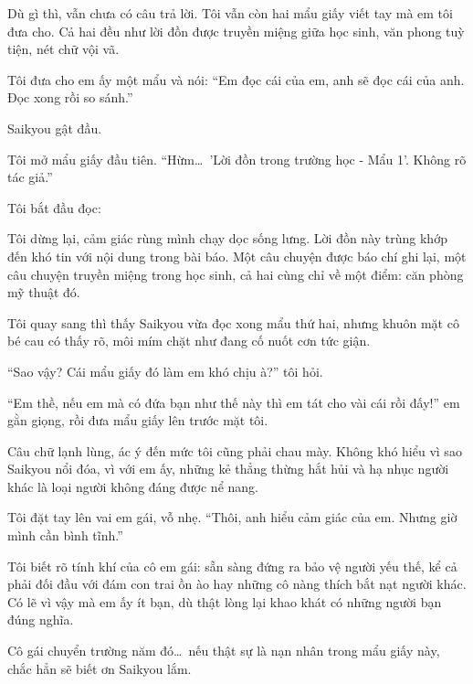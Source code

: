 \documentclass[../main.tex]{subfiles}
\begin{document}
Dù gì thì, vẫn chưa có câu trả lời. Tôi vẫn còn hai mẩu giấy viết tay mà em tôi đưa cho. Cả hai đều như lời đồn được truyền miệng giữa học sinh, văn phong tuỳ tiện, nét chữ vội vã.

Tôi đưa cho em ấy một mẩu và nói: ``Em đọc cái của em, anh sẽ đọc cái của anh. Đọc xong rồi so sánh.''

Saikyou gật đầu.

Tôi mở mẩu giấy đầu tiên.
``Hừm\dots\ {\vnmsans 'Lời đồn trong trường học - Mẩu 1'}. Không rõ tác giả.''

Tôi bắt đầu đọc:


Tôi dừng lại, cảm giác rùng mình chạy dọc sống lưng. Lời đồn này trùng khớp đến khó tin với nội dung trong bài báo. Một câu chuyện được báo chí ghi lại, một câu chuyện truyền miệng trong học sinh, cả hai cùng chỉ về một điểm: căn phòng mỹ thuật đó.

Tôi quay sang thì thấy Saikyou vừa đọc xong mẩu thứ hai, nhưng khuôn mặt cô bé cau có thấy rõ, môi mím chặt như đang cố nuốt cơn tức giận.

``Sao vậy? Cái mẩu giấy đó làm em khó chịu à?'' tôi hỏi.

``Em thề, nếu em mà có đứa bạn như thế này thì em tát cho vài cái rồi đấy!'' em gằn giọng, rồi đưa mẩu giấy lên trước mặt tôi.


Câu chữ lạnh lùng, ác ý đến mức tôi cũng phải chau mày. Không khó hiểu vì sao Saikyou nổi đóa, vì với em ấy, những kẻ thẳng thừng hắt hủi và hạ nhục người khác là loại người không đáng được nể nang.

Tôi đặt tay lên vai em gái, vỗ nhẹ. ``Thôi, anh hiểu cảm giác của em. Nhưng giờ mình cần bình tĩnh.''

Tôi biết rõ tính khí của cô em gái: sẵn sàng đứng ra bảo vệ người yếu thế, kể cả phải đối đầu với đám con trai ồn ào hay những cô nàng thích bắt nạt người khác. Có lẽ vì vậy mà em ấy ít bạn, dù thật lòng lại khao khát có những người bạn đúng nghĩa.

Cô gái chuyển trường năm đó\dots\ nếu thật sự là nạn nhân trong mẩu giấy này, chắc hẳn sẽ biết ơn Saikyou lắm.
\end{document}
